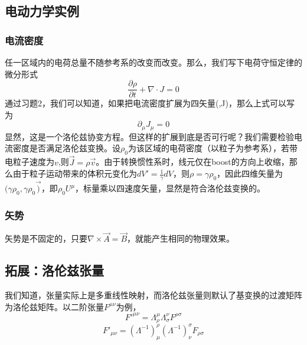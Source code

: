 \subsection{电动力学实例}
\subsubsection{电流密度}
任一区域内的电荷总量不随参考系的改变而改变。那么，我们写下电荷守恒定律的微分形式
\begin{equation}
\frac{\partial\rho}{\partial t}+\nabla \cdot J=0
\end{equation}
通过习题2，我们可以知道，如果把电流密度扩展为四矢量(\rho,\vec J)，那么上式可以写为
\begin{equation}
\partial_\mu J_\mu=0
\end{equation}
显然，这是一个洛伦兹协变方程。但这样的扩展到底是否可行呢？我们需要检验电流密度是否满足洛伦兹变换。设$\rho_0$为该区域的电荷密度（以粒子为参考系），若带电粒子速度为$v$,则$\vec J=\rho \vec v$。由于转换惯性系时，线元仅在boost的方向上收缩，那么由于粒子运动带来的体积元变化为$dV'=\frac{1}{\gamma}dV$，则$\rho=\gamma\rho_0$，因此四维矢量为$(\gamma\rho_0,\gamma\rho_0\vec)$，即$\rho_0U^\mu$，标量乘以四速度矢量，显然是符合洛伦兹变换的。
\subsubsection{矢势}
矢势是不固定的，只要$\nabla \times\vec A=\vec B$，就能产生相同的物理效果。
\subsection{拓展：洛伦兹张量}
我们知道，张量实际上是多重线性映射，而洛伦兹张量则默认了基变换的过渡矩阵为洛伦兹矩阵。以二阶张量$F^{\mu\nu} $为例，
\begin{equation}
F'^{\mu\nu}=\Lambda_\rho^\mu \Lambda_\sigma^\nu F^{\rho\sigma}  
\end{equation}
\begin{equation}
F'_{\mu\nu}=(\Lambda^{-1})_\mu^\rho (\Lambda^{-1})_\nu^\sigma F_{\rho\sigma}
\end{equation}


